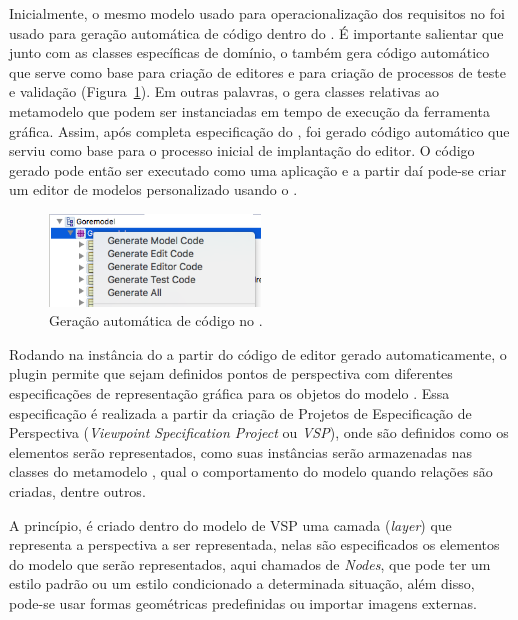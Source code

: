 Inicialmente, o mesmo modelo \ecore usado para operacionalização dos requisitos no \zanshin foi usado para geração automática de código dentro do \eclipse \emf. É importante salientar que junto com as classes específicas de domínio, o \emf também gera código automático que serve como base para criação de editores e para criação de processos de teste e validação (Figura~\ref{figura-gera-codigo}). Em outras palavras, o \emf gera classes relativas ao metamodelo que podem ser instanciadas em tempo de execução da ferramenta gráfica.  Assim, após completa especificação do \ecore, foi gerado código automático que serviu como base para o processo inicial de implantação do editor. O código gerado pode então ser executado como uma aplicação \eclipse e a partir daí pode-se criar um editor de modelos personalizado usando o \sirius.


\begin{figure}
	\centering
	\includegraphics[width=0.5\textwidth]{figuras/unagi/exemplo-gera-codigo.png}
	\caption{Geração automática de código no \eclipse.}
	\label{figura-gera-codigo}
\end{figure}

Rodando na instância do \eclipse a partir do código de editor gerado automaticamente, o plugin \sirius permite que sejam definidos pontos de perspectiva com diferentes especificações de representação gráfica para os objetos do modelo \ecore. Essa especificação é realizada a partir da criação de Projetos de Especificação de Perspectiva (\textit{Viewpoint Specification Project} ou \textit{VSP}), onde são definidos como os elementos serão representados, como suas instâncias serão armazenadas nas classes do metamodelo \ecore, qual o comportamento do modelo quando relações são criadas, dentre outros.

A princípio, é criado dentro do modelo de VSP uma camada (\textit{layer}) que representa a perspectiva a ser representada, nelas são especificados os elementos do modelo \ecore que serão representados, aqui chamados de \textit{Nodes}, que pode ter um estilo padrão ou um estilo condicionado a determinada situação, além disso, pode-se usar formas geométricas predefinidas ou importar imagens externas. 

